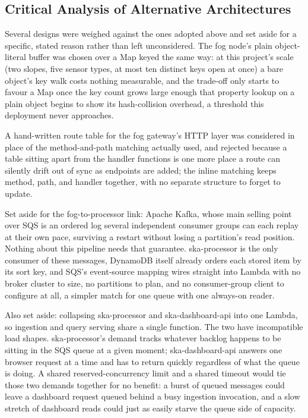 \documentclass[conference]{IEEEtran}
\begin{document}
\subsection{Critical Analysis of Alternative Architectures}
Several designs were weighed against the ones adopted above and set aside for a specific, stated reason rather than left unconsidered. The fog node's plain object-literal buffer was chosen over a Map keyed the same way: at this project's scale (two slopes, five sensor types, at most ten distinct keys open at once) a bare object's key walk costs nothing measurable, and the trade-off only starts to favour a Map once the key count grows large enough that property lookup on a plain object begins to show its hash-collision overhead, a threshold this deployment never approaches.

A hand-written route table for the fog gateway's HTTP layer was considered in place of the method-and-path matching actually used, and rejected because a table sitting apart from the handler functions is one more place a route can silently drift out of sync as endpoints are added; the inline matching keeps method, path, and handler together, with no separate structure to forget to update.

Set aside for the fog-to-processor link: Apache Kafka, whose main selling point over SQS is an ordered log several independent consumer groups can each replay at their own pace, surviving a restart without losing a partition's read position. Nothing about this pipeline needs that guarantee. ska-processor is the only consumer of these messages, DynamoDB itself already orders each stored item by its sort key, and SQS's event-source mapping wires straight into Lambda with no broker cluster to size, no partitions to plan, and no consumer-group client to configure at all, a simpler match for one queue with one always-on reader.

Also set aside: collapsing ska-processor and ska-dashboard-api into one Lambda, so ingestion and query serving share a single function. The two have incompatible load shapes. ska-processor's demand tracks whatever backlog happens to be sitting in the SQS queue at a given moment; ska-dashboard-api answers one browser request at a time and has to return quickly regardless of what the queue is doing. A shared reserved-concurrency limit and a shared timeout would tie those two demands together for no benefit: a burst of queued messages could leave a dashboard request queued behind a busy ingestion invocation, and a slow stretch of dashboard reads could just as easily starve the queue side of capacity.
\end{document}
